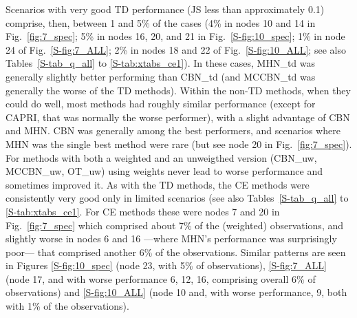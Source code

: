 \documentclass[a4paper,10pt]{article}
\begin{document}
Scenarios with very good TD performance (JS less than approximately 0.1)
comprise, then, between 1 and 5\% of the cases (4\% in nodes 10 and 14 in
Fig.~\ref{fig:7_spec}; 5\% in nodes 16, 20, and 21 in Fig.~\ref{S-fig:10_spec};
1\% in node 24 of Fig.~\ref{S-fig:7_ALL}; 2\% in nodes 18 and 22 of
Fig.~\ref{S-fig:10_ALL}; see also Tables~\ref{S-tab_q_all} to
\ref{S-tab:xtabs_ce1}). In these cases, MHN\_td was generally slightly better
performing than CBN\_td (and MCCBN\_td was generally the worse of the TD
methods). Within the non-TD methods, when they could do well, most methods had
roughly similar performance (except for CAPRI, that was normally the worse
performer), with a slight advantage of CBN and MHN. CBN was generally among the
best performers, and scenarios where MHN was the single best method were rare
(but see node 20 in Fig.~\ref{fig:7_spec}). For methods with both a weighted and
an unweigthed version (CBN\_uw, MCCBN\_uw, OT\_uw) using weights never lead to
worse performance and sometimes improved it. As with the TD methods, the CE
methods were consistently very good only in limited scenarios (see also
Tables~\ref{S-tab_q_all} to \ref{S-tab:xtabs_ce1}. For CE methods these were
nodes 7 and 20 in Fig.~\ref{fig:7_spec} which comprised about 7\% of the
(weighted) observations, and slightly worse in nodes 6 and 16 ---where MHN's
performance was surprisingly poor--- that comprised another 6\% of the
observations. Similar patterns are seen in Figures \ref{S-fig:10_spec} (node 23,
with 5\% of observations), \ref{S-fig:7_ALL} (node 17, and with worse
performance 6, 12, 16, comprising overall 6\% of observations) and
\ref{S-fig:10_ALL} (node 10 and, with worse performance, 9, both with 1\% of the
observations).


\end{document}
